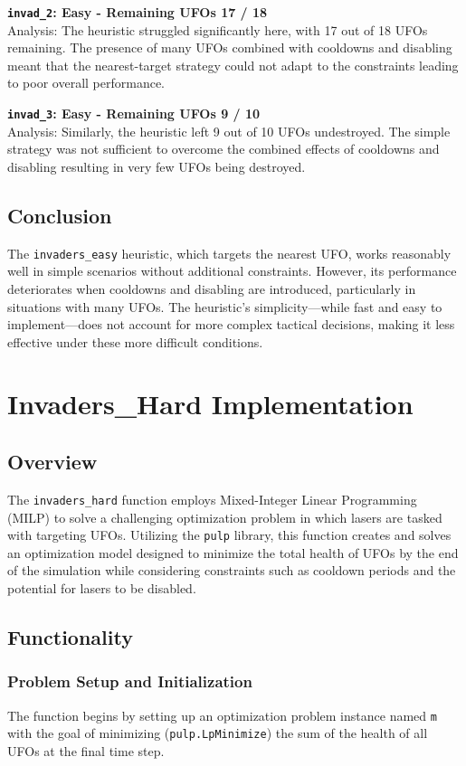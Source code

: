 \documentclass[12pt]{article}
\begin{document}
\textbf{\texttt{invad\_2}: Easy - Remaining UFOs 17 / 18}\\
Analysis: The heuristic struggled significantly here, with 17 out of 18 UFOs remaining. The presence of many UFOs combined with cooldowns and disabling meant that the nearest-target strategy could not adapt to the constraints leading to poor overall performance.

\textbf{\texttt{invad\_3}: Easy - Remaining UFOs 9 / 10}\\
Analysis: Similarly, the heuristic left 9 out of 10 UFOs undestroyed. The simple strategy was not sufficient to overcome the combined effects of cooldowns and disabling resulting in very few UFOs being destroyed.

\subsection{Conclusion}
The \texttt{invaders\_easy} heuristic, which targets the nearest UFO, works reasonably well in simple scenarios without additional constraints. However, its performance deteriorates when cooldowns and disabling are introduced, particularly in situations with many UFOs. The heuristic's simplicity—while fast and easy to implement—does not account for more complex tactical decisions, making it less effective under these more difficult conditions.

\section{Invaders\_Hard Implementation}
\subsection{Overview}
The \texttt{invaders\_hard} function employs Mixed-Integer Linear Programming (MILP) to solve a challenging optimization problem in which lasers are tasked with targeting UFOs. Utilizing the \texttt{pulp} library, this function creates and solves an optimization model designed to minimize the total health of UFOs by the end of the simulation while considering constraints such as cooldown periods and the potential for lasers to be disabled.

\subsection{Functionality}
\subsubsection{Problem Setup and Initialization}
The function begins by setting up an optimization problem instance named \texttt{m} with the goal of minimizing (\texttt{pulp.LpMinimize}) the sum of the health of all UFOs at the final time step.
\end{document}
